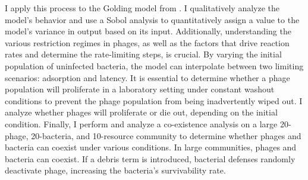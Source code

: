 \documentclass[11pt, oneside, draft]{Thesis}
\begin{document}
{    I apply this process to the Golding model from \citet{gengUsingBacterialPopulation2024}. 
    I qualitatively analyze the model's behavior and use a Sobol analysis to quantitatively assign a value to the model's variance in output based on its input. 
    Additionally, understanding the various restriction regimes in phages, as well as the factors that drive reaction rates and determine the rate-limiting steps, is crucial.
    By varying the initial population of uninfected bacteria, the model can interpolate between two limiting scenarios: adsorption and latency. 
    It is essential to determine whether a phage population will proliferate in a laboratory setting under constant washout conditions to prevent the phage population from being inadvertently wiped out. 
    I analyze whether phages will proliferate or die out, depending on the initial condition. 
    Finally, I perform and analyze a co-existence analysis on a large 20-phage, 20-bacteria, and 10-resource community to determine whether phages and bacteria can coexist under various conditions. 
    In large communities, phages and bacteria can coexist. 
    If a debris term is introduced, bacterial defenses randomly deactivate phage, increasing the bacteria's survivability rate.

}
\clearpage 

\end{document}
